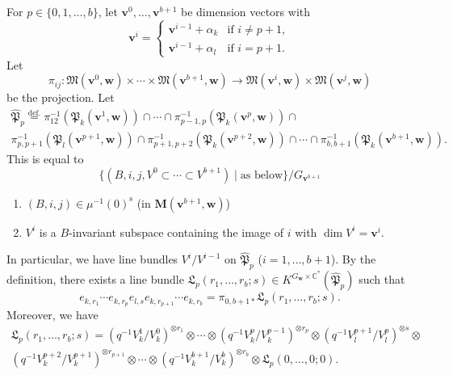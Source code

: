\documentclass[12pt]{amsart}
\def\Bbb{\mathbb}
\def\frak{\mathfrak}
\renewcommand{\labelenumi}{(\theenumi)}%
\newenvironment{aenume}{%
  \begin{enumerate}%
  \renewcommand{\theenumi}{\alph{enumi}}%
  \renewcommand{\labelenumi}{(\theenumi)}%
  }{\end{enumerate}}
\theoremstyle{definition}
\theoremstyle{remark}
\numberwithin{equation}{subsection}
\newcommand{\defeq}{\overset{\operatorname{\scriptstyle def.}}{=}}
\newcommand{\C}{{\Bbb C}}
\newcommand{\bM}{{\mathbf M}} %
\newcommand{\M}{{\frak M}} %
\newcommand{\bv}{{\mathbf v}} %
\newcommand{\bw}{{\mathbf w}} %
\newcommand{\Pa}{{\frak P}} %
\begin{document}
For $p\in \{0,1,\dots, b\}$, let $\bv^0,\dots,\bv^{b+1}$ be dimension
vectors with
\begin{equation*}
   \bv^i = 
   \begin{cases}
     \bv^{i-1} + \alpha_k & \text{if $i\neq p+1$}, \\
     \bv^{i-1} + \alpha_l & \text{if $i = p+1$}.
   \end{cases}
\end{equation*}
Let
\begin{equation*}
   \pi_{ij}\colon
   \M(\bv^0,\bw)\times\cdots\times \M(\bv^{b+1},\bw) \to
   \M(\bv^{i},\bw)\times\M(\bv^j,\bw)
\end{equation*}
be the projection. Let
\begin{multline}\label{eq:inter}
   \widehat\Pa_p \defeq
   \pi_{12}^{-1}(\Pa_k(\bv^1,\bw))\cap \cdots\cap
   \pi_{p-1,p}^{-1}(\Pa_k(\bv^p,\bw))\cap \\
   \pi_{p,p+1}^{-1}(\Pa_l(\bv^{p+1},\bw))\cap
   \pi_{p+1,p+2}^{-1}(\Pa_k(\bv^{p+2},\bw))\cap\cdots\cap
   \pi_{b,b+1}^{-1}(\Pa_k(\bv^{b+1},\bw)).
\end{multline}
This is equal to
\begin{equation*}
   \{ (B,i,j,V^0\subset\cdots\subset V^{b+1}) \mid
   \text{as below}\} /G_{\bv^{b+1}}
\end{equation*}
\begin{aenume}
\item $(B,i,j)\in \mu^{-1}(0)^{\operatorname{s}}$
   (in $\bM(\bv^{b+1},\bw)$)
\item $V^i$ is a $B$-invariant subspace containing the image of $i$
with $\dim V^i = \bv^i$.
\end{aenume}
In particular, we have line bundles $V^i/V^{i-1}$ on $\widehat\Pa_p$
($i = 1,\dots,b+1$).
By the definition, there exists a line bundle $\mathfrak
L_p(r_1,\dots,r_b;s)\in K^{G_\bw\times\C^*}(\widehat\Pa_p)$ such that
\begin{equation*}
   e_{k,r_1}\cdots e_{k,r_p} e_{l,s} e_{k,r_{p+1}}\cdots e_{k,r_b}
    = \pi_{0,b+1 *} \mathfrak L_p(r_1,\dots,r_b;s).
\end{equation*}
Moreover, we have
\begin{multline}\label{eq:LL}
   \mathfrak L_p(r_1,\dots,r_b;s) =
   \left(q^{-1} V^1_k/V^0_k \right)^{\otimes r_1}
    \otimes \cdots \otimes
   \left(q^{-1} V^p_k/V^{p-1}_k \right)^{\otimes r_p} \otimes
   \left(q^{-1} V^{p+1}_l/V^{p}_l \right)^{\otimes s} \otimes \\
   \left(q^{-1} V^{p+2}_k/V^{p+1}_k \right)^{\otimes r_{p+1}}
    \otimes\cdots\otimes
   \left(q^{-1} V^{b+1}_k/V^{b}_k \right)^{\otimes r_{b}} \otimes
   \mathfrak L_p(0,\dots,0;0).
\end{multline}
\end{document}

